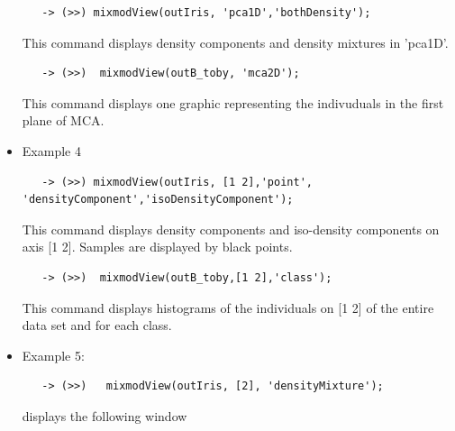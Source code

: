 \begin{itemize}
{\scriptsize
 \begin{verbatim}
   -> (>>) mixmodView(outIris, 'pca1D','bothDensity');
 \end{verbatim}
}

This command displays density components and density mixtures in 'pca1D'.\\



{\scriptsize
 \begin{verbatim}
   -> (>>)  mixmodView(outB_toby, 'mca2D');
 \end{verbatim}
}


This command displays one graphic representing the indivuduals in the first plane of MCA.\\









 \item Example 4

{\scriptsize
 \begin{verbatim}
   -> (>>) mixmodView(outIris, [1 2],'point', 'densityComponent','isoDensityComponent');
 \end{verbatim}
}



This command displays density components and iso-density components on axis [1 2].
Samples are displayed by black points.\\



{\scriptsize
 \begin{verbatim}
   -> (>>)  mixmodView(outB_toby,[1 2],'class');
 \end{verbatim}
}


This command displays histograms of the individuals on [1 2] of the entire data set and for each class.\\









 \item Example 5:

{\scriptsize
 \begin{verbatim}
   -> (>>)   mixmodView(outIris, [2], 'densityMixture');
 \end{verbatim}
}


displays the following window



\end{itemize}
